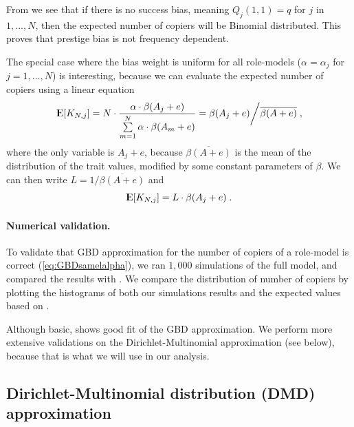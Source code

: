 \documentclass[12pt]{extarticle}
\DeclareMathOperator*{\E}{{\rm I\kern-.3em E}}
\begin{document}
From  we see that if there is no success bias, meaning $Q_j(1,1)=q$ for $j$ in $1,...,N$, then the expected number of copiers will be Binomial distributed. This proves that prestige bias is not frequency dependent.

The special case where the bias weight is uniform for all role-models ($\alpha = \alpha_j$ for $j=1,\ldots, N$) is interesting, because we can evaluate the expected number of copiers using a linear equation
\begin{equation}\label{eq:GBDsamelalpha}
\E[K_{N,j}]= N\cdot\frac{\alpha\cdot\beta(A_j+e)}{\sum\limits_{m=1}^{N}\alpha\cdot\beta(A_m+e)} =\beta(A_j+e) \bigg/ \overline{\beta(A+e)} \;,
\end{equation}
where the only variable is $A_j+e$, because $\overline{\beta(A+e)}$ is the mean of the distribution of the trait values, modified by some constant parameters of $\beta$.
We can then write $L = 1/\overline{\beta(A+e)}$ and
\begin{equation}\label{eq:linearEq}
\E[K_{N,j}] = L\cdot \beta(A_j+e) \;.
\end{equation}

\paragraph{Numerical validation.}
To validate that GBD approximation for the number of copiers of a role-model is correct (\cref{eq:GBDsamelalpha}), %
we ran $1,000$ simulations of the full model, and compared the results with .
We compare the distribution of number of copiers by plotting the histograms of both our simulations results and the expected values based on .

Although basic,  shows good fit of the GBD approximation.
We perform more extensive validations on the Dirichlet-Multinomial approximation (see below), because that is what we will use in our analysis.

\subsection*{Dirichlet-Multinomial distribution (DMD) approximation}
\end{document}
